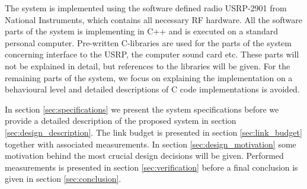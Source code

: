 The system is implemented using the software defined radio USRP-2901\cite{USRP2901} from National Instruments, which contains all necessary RF hardware. All the software parts of the system is implementing in C++ and is executed on a standard personal computer. Pre-written C-libraries are used for the parts of the system concerning interface to the USRP, the computer sound card etc. These parts will not be explained in detail, but references to the libraries will be given. For the remaining parts of the system, we focus on explaining the implementation on a behavioural level and detailed descriptions of C code implementations is avoided. 

In section \ref{sec:specifications} we present the system specifications before we provide a detailed description of the proposed system in section \ref{sec:design_description}. The link budget is presented in section \ref{sec:link_budget} together with associated measurements. In section \ref{sec:design_motivation} some motivation behind the most crucial design decisions will be given. Performed measurements is presented in section \ref{sec:verification} before a final conclusion is given in section \ref{sec:conclusion}.